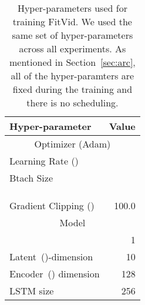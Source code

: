 \documentclass{article}
\newcommand{\model}{FitVid\xspace}
\begin{document}
\begin{table}[!htp]\centering
\caption{Hyper-parameters used for training \model. We used the same set of hyper-parameters across all experiments. As mentioned in Section~\ref{sec:arc}, all of the hyper-paramters are fixed during the training and there is no scheduling.}
\label{tab:hyper}
\scriptsize
\begin{tabular}{lr}\toprule
Hyper-parameter &Value \\\midrule\midrule
\multicolumn{2}{c}{Optimizer (Adam\cite{kingma2014adam})} \\
\midrule
Learning Rate () & \\
Btach Size & \\
 & \\
 & \\
 & \\
Gradient Clipping () &100.0 \\
\midrule
\multicolumn{2}{c}{Model} \\
\midrule
 &1  \\
Latent~()-dimension &10 \\
Encoder~() dimension &128 \\
LSTM size &256 \\
\bottomrule
\end{tabular}
\end{table}
\end{document}
